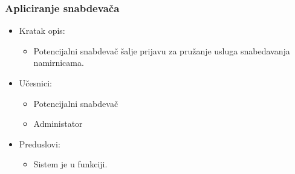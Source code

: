 \subsubsection{Apliciranje snabdevača}

\begin{itemize}
	\item Kratak opis:
		\begin{itemize}
			\item Potencijalni snabdevač šalje prijavu za pružanje usluga snabedavanja namirnicama.
		\end{itemize}
	\item Učesnici:
		\begin{itemize}
			\item Potencijalni snabdevač
			\item Administator
		\end{itemize}	
	\item Preduslovi:
		\begin{itemize}
	       \item Sistem je u funkciji.
		\end{itemize}	


\end{itemize}
